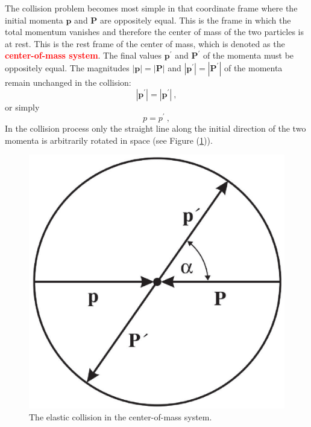 \documentclass[11pt,a4paper]{article}
\renewcommand{\vec}[1]{\boldsymbol{#1}}
\begin{document}
The collision problem becomes most simple in that coordinate frame where the initial momenta $\vec{p}$ and $\vec{P}$ are oppositely equal. This is the frame in which the total momentum vanishes and therefore the center of mass of the two particles is at rest. This is the rest frame of the center of mass, which is denoted as the \textcolor{red}{\bf center-of-mass system}. The final values $\vec{p}^{\prime}$ and $\vec{P}^{\prime}$ of the momenta must be oppositely equal. The magnitudes $|\vec{p}| = |\vec{P}|$  and $|\vec{p}^{\prime}| = |\vec{P}^{\prime}|$ of the momenta remain unchanged in the collision:
\begin{equation*}
|\vec{p}^{\prime}| = |\vec{p}^{\prime}| ~,
\end{equation*}
or simply
\begin{equation}
p = p^{\prime} ~,
\end{equation}
In the collision process only the straight line along the initial direction of the two momenta is arbitrarily rotated in space (see Figure (\ref{fig:elastic_collision})). 

\begin{figure}
\centering
\includegraphics[height=5.cm, angle=0]{elastic_collision.eps}
\caption{
The elastic collision in the center-of-mass system. 
}
\label{fig:elastic_collision}
\end{figure}
\end{document}
